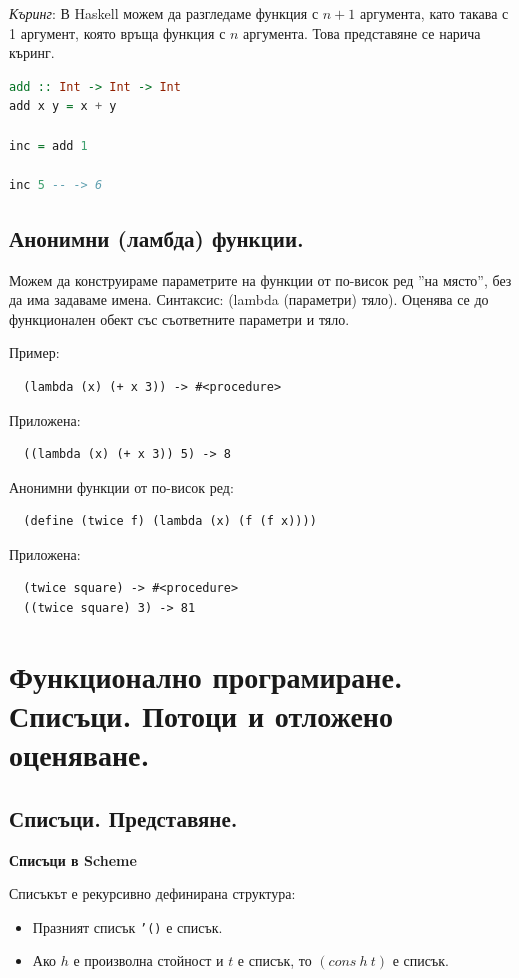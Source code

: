 \documentclass{article}
\renewcommand{\\}{\newline}
\begin{document}
\textit{Къринг}: В Haskell можем да разгледаме функция с \(n+1\) аргумента, като такава с 1 аргумент, която връща функция с \(n\) аргумента. Това представяне се нарича къринг.
\begin{lstlisting}[language=Haskell]
add :: Int -> Int -> Int
add x y = x + y

inc = add 1

inc 5 -- -> 6
\end{lstlisting}


\subsection{Анонимни (ламбда) функции.}
Можем да конструираме параметрите на функции от по-висок ред ''на място'', без да има задаваме имена. Синтаксис: (lambda (параметри) тяло). Оценява се до функционален обект със съответните параметри и тяло.

Пример:
\begin{lstlisting}
  (lambda (x) (+ x 3)) -> #<procedure>
\end{lstlisting}
Приложена:
\begin{lstlisting}
  ((lambda (x) (+ x 3)) 5) -> 8
\end{lstlisting}

Анонимни функции от по-висок ред:
\begin{lstlisting}
  (define (twice f) (lambda (x) (f (f x))))
\end{lstlisting}
Приложена:
\begin{lstlisting}
  (twice square) -> #<procedure>
  ((twice square) 3) -> 81
\end{lstlisting}
\newpage

\section{Функционално програмиране. Списъци. Потоци и отложено оценяване.}

\subsection{Списъци. Представяне.}

\textbf{Списъци в Scheme}

Списъкът е рекурсивно дефинирана структура:
\begin{itemize}
    \item Празният списък \texttt{'()} е списък.
    \item Ако \(h\) е произволна стойност и \(t\) е списък, то \((cons\ h\ t)\) е списък.
\end{itemize}
\end{document}
